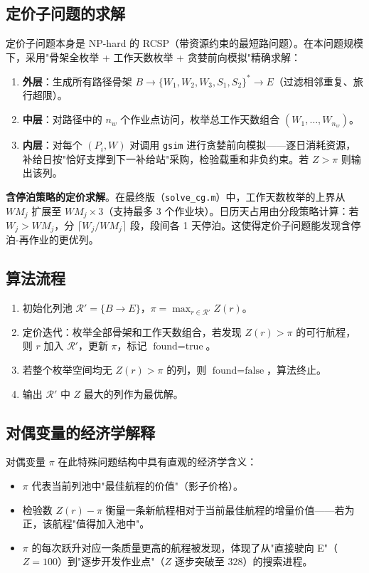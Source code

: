 \documentclass[12pt,a4paper]{ctexart}
\theoremstyle{definition}
\begin{document}
\subsection{定价子问题的求解}

定价子问题本身是 NP-hard 的 RCSP（带资源约束的最短路问题）。在本问题规模下，采用"骨架全枚举 + 工作天数枚举 + 贪婪前向模拟"精确求解：

\begin{enumerate}
  \item \textbf{外层}：生成所有路径骨架 $B\to\{W_1,W_2,W_3,S_1,S_2\}^*\to E$（过滤相邻重复、旅行超限）。
  \item \textbf{中层}：对路径中的 $n_w$ 个作业点访问，枚举总工作天数组合 $(W_1,\dots,W_{n_w})$。
  \item \textbf{内层}：对每个 $(P_i,W)$ 对调用 \texttt{gsim} 进行贪婪前向模拟——逐日消耗资源，补给日按"恰好支撑到下一补给站"采购，检验载重和非负约束。若 $Z>\pi$ 则输出该列。
\end{enumerate}

\textbf{含停泊策略的定价求解}。在最终版（\texttt{solve\_cg.m}）中，工作天数枚举的上界从 $WM_j$ 扩展至 $WM_j\times 3$（支持最多 3 个作业块）。日历天占用由分段策略计算：若 $W_j>WM_j$，分 $\lceil W_j/WM_j\rceil$ 段，段间各 1 天停泊。这使得定价子问题能发现含停泊-再作业的更优列。

\subsection{算法流程}

\begin{enumerate}
  \item 初始化列池 $\mathcal{R}' = \{B\to E\}$，$\pi = \max_{r\in\mathcal{R}'} Z(r)$。
  \item 定价迭代：枚举全部骨架和工作天数组合，若发现 $Z(r)>\pi$ 的可行航程，则 $r$ 加入 $\mathcal{R}'$，更新 $\pi$，标记 $\text{found}=\text{true}$。
  \item 若整个枚举空间均无 $Z(r)>\pi$ 的列，则 $\text{found}=\text{false}$，算法终止。
  \item 输出 $\mathcal{R}'$ 中 $Z$ 最大的列作为最优解。
\end{enumerate}

\subsection{对偶变量的经济学解释}

对偶变量 $\pi$ 在此特殊问题结构中具有直观的经济学含义：
\begin{itemize}
  \item $\pi$ 代表当前列池中"最佳航程的价值"（影子价格）。
  \item 检验数 $Z(r)-\pi$ 衡量一条新航程相对于当前最佳航程的增量价值——若为正，该航程"值得加入池中"。
  \item $\pi$ 的每次跃升对应一条质量更高的航程被发现，体现了从"直接驶向 E"（$Z=100$）到"逐步开发作业点"（$Z$ 逐步突破至 $328$）的搜索进程。
\end{itemize}
\end{document}
